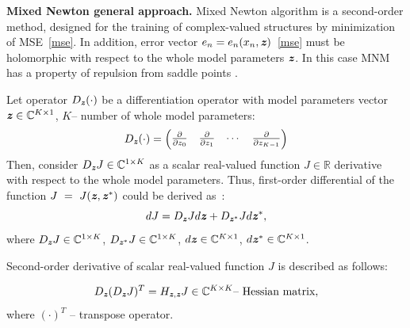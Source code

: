 \documentclass[12pt]{article}
\newcommand{\bit}[1]{\ensuremath{\textbf{\textit{#1}}}}
\begin{document}
\textbf{Mixed Newton general approach.}
Mixed Newton algorithm is a second-order method, designed for the training of complex-valued structures by minimization of MSE~\eqref{mse}. In addition, error vector $e_n=e_n(x_n, \bit{z})$~\eqref{mse} must be holomorphic with respect to the whole model parameters \bit{z}. In this case MNM has a property of repulsion from saddle points \cite{mixed_newton}.

Let operator $D_{\bit{z}}(\cdot)$ be a differentiation operator with model parameters vector $\bit{z}\in\mathbb{C}^{K\times 1}$, $K$-- number of whole model parameters:
\begin{equation}
    D_{\bit{z}}(\cdot)=\begin{pmatrix}
        \frac{\partial }{\partial z_0} &
        \frac{\partial }{\partial z_1} &
        \cdots &
        \frac{\partial }{\partial z_{K-1}}
    \end{pmatrix}
\end{equation}
Then, consider $D_{\bit{z}}J\in\mathbb{C}^{1\times K}$ as a scalar real-valued function $J\in\mathbb{R}$ derivative with respect to the whole model parameters. Thus, first-order differential of the function $J~=~J(\bit{z}, \bit{z}^*)$ could be derived as~\cite{complex_deriv}:
\begin{equation}
    dJ=D_{\bit{z}}Jd\bit{z}+D_{\bit{z}^*}Jd\bit{z}^*,
    \label{first_diff}
\end{equation}
where $D_{\bit{z}}J\in\mathbb{C}^{1\times K}$, $D_{\bit{z}^*}J\in\mathbb{C}^{1\times K}$, $d\bit{z}\in\mathbb{C}^{K\times 1}$, $d\bit{z}^*\in\mathbb{C}^{K\times 1}$.

Second-order derivative of scalar real-valued function $J$ is described as follows:

\begin{equation}
    D_{\bit{z}}(D_{\bit{z}}J)^T=H_{\bit{z}, \bit{z}}J\in\mathbb{C}^{K\times K}\text{-- Hessian matrix},
    \label{hessian_calc}
\end{equation}
where $(\cdot)^T$ -- transpose operator.
\end{document}
